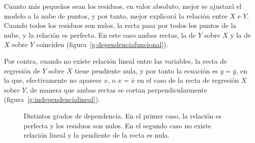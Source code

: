 Cuanto más pequeños sean los residuos, en valor absoluto, mejor se ajustará el modelo a la nube de
puntos, y por tanto, mejor explicará la relación entre $X$ e $Y$. Cuando todos
los residuos son nulos, la recta pasa por todos los puntos de la nube, y la
relación es perfecta. En este caso ambas rectas, la de $Y$ sobre $X$ y la de
$X$ sobre $Y$ coinciden (figura~\ref{g:dependenciafuncional}).

Por contra, cuando no existe relación lineal entre las variables, la recta de
regresión de $Y$ sobre $X$ tiene pendiente nula, y por tanto la
ecuación es $y=\bar y$, en la que, efectivamente no aparece $x$, o $x=\bar x$
en el caso de la recta de regresión $X$ sobre $Y$, de manera que ambas rectas
se cortan perpendicularmente (figura~\ref{g:independencialineal}).

\begin{figure}[htbp]
\centering 
{}\qquad
{}
\caption{Distintos grados de dependencia. En el primer caso, la relación es perfecta
y los residuos son nulos. En el segundo caso no existe relación lineal y la
pendiente de la recta es nula.}
\end{figure}



